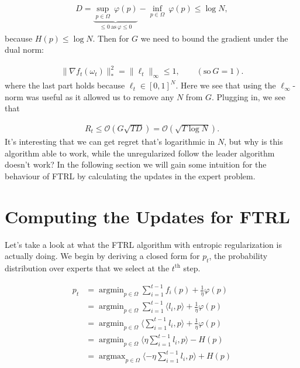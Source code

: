 \documentclass[11pt]{article}
\newcommand{\argmin}{\mathop{\text{argmin}}}
\newcommand{\argmax}{\mathop{\text{argmax}}}
\begin{document}
\begin{align}
    D = \underbrace{\underset{p \in \Omega}{\sup}\ \varphi(p)}_{\leq 0 \ \text{as} \ \varphi \leq 0} - \underset{p \in \Omega}{\inf}\ \varphi(p) \leq \log N,
\end{align}
because \(H(p) \leq \log N\). Then for \(G\) we need to bound the gradient under the dual norm:

\begin{align}
    \|\nabla f_t(\omega_t)\|_*^2 = \|\ell_t\|_\infty \leq 1, \qquad (\text{so} \ G=1).
\end{align}
where the last part holds because $\ell_t \in [0, 1]^N$. Here we see that using the \(\ell_\infty\)-norm was useful as it allowed us to remove any \(N\) from \(G\). Plugging in, we see that 

\begin{align}
    R_t \leq \mathcal{O}(G\sqrt{TD}) = \mathcal{O}(\sqrt{T\log N}).
\end{align}
It's interesting that we can get regret that's logarithmic in \(N\), but why is this algorithm able to work, while the unregularized follow the leader algorithm doesn't work? In the following section we will gain some intuition for the behaviour of FTRL by calculating the updates in the expert problem. 

\section{Computing the Updates for FTRL}

Let's take a look at what the FTRL algorithm with entropic regularization is actually doing. We begin by deriving a closed form for $p_t$, the probability distribution over experts that we select at the $t^{\mbox{th}}$ step.

\begin{align*}
p_t &= \argmin_{p \in \Omega} \sum_{i=1}^{t-1} f_i(p) + \frac{1}{\eta} \varphi(p) \\
&= \argmin_{p \in \Omega} \sum_{i=1}^{t-1} \langle l_i, p \rangle + \frac{1}{\eta} \varphi(p) \\
&= \argmin_{p \in \Omega}\langle \sum_{i=1}^{t-1}  l_i, p \rangle + \frac{1}{\eta} \varphi(p) \\
&= \argmin_{p \in \Omega}\langle \eta\sum_{i=1}^{t-1}  l_i, p\rangle -  H(p) \\
&= \argmax_{p \in \Omega}\langle -\eta\sum_{i=1}^{t-1}  l_i, p\rangle +  H(p) \\
\end{align*}
\end{document}

